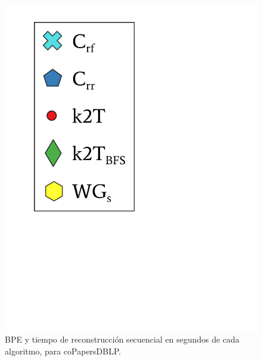 \begin{frame}
\begin{figure}
\begin{minipage}{1\textwidth}
\begin{minipage}{0.15\textwidth}
    			\includegraphics[scale=.16, clip, trim=70 200 280 40]{../img/bpeTimes/labelSec.pdf}
    		\end{minipage}	
    	\end{minipage}

	\caption{BPE y tiempo de reconstrucción secuencial en segundos de cada algoritmo, para coPapersDBLP.}
\end{figure}

\end{frame}

